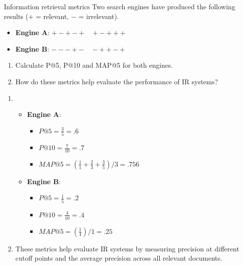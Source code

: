 \documentclass{article}
\begin{document}
\begin{exercise}{Information retrieval metrics}\label{ex:ir-metrics}
  Two search engines have produced the following results ($+$ = relevant, $-$ = irrelevant).
  \begin{itemize}
    \item \textbf{Engine A}: $+-+-+\quad+-+++$
    \item \textbf{Engine B}: $---+-\quad-++-+$
  \end{itemize}

  \begin{enumerate}
    \item Calculate P@5, P@10 and MAP@5 for both engines.
    \item How do these metrics help evaluate the performance of IR systems?
  \end{enumerate}

  \begin{solution}
    \begin{enumerate}
      \item \begin{itemize}
          \item \textbf{Engine A}:
            \begin{itemize}
              \item $P@5 = \frac{3}{5} = .6$
              \item $P@10 = \frac{7}{10} = .7$
              \item $MAP@5 = (\frac{1}{1} + \frac{2}{3} + \frac{3}{5}) / 3 = .756$
            \end{itemize}
          \item \textbf{Engine B}:
            \begin{itemize}
              \item $P@5 = \frac{1}{5} = .2$
              \item $P@10 = \frac{4}{10} = .4$
              \item $MAP@5 = (\frac{1}{4}) / 1 = .25$
            \end{itemize}
        \end{itemize}
      \item These metrics help evaluate IR systems by measuring precision at different cutoff points and the average precision across all relevant documents.
    \end{enumerate}
  \end{solution}
\end{exercise}
\end{document}
